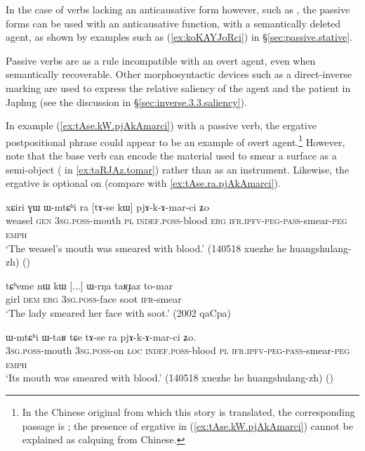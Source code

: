 In the case of verbs lacking an anticausative form however, such as  , the passive forms can be used with an anticausative function, with a semantically deleted agent, as shown by examples such as (\ref{ex:koKAYJoRci}) in §\ref{sec:passive.stative}.

Passive verbs are as a rule incompatible with an overt agent, even when semantically recoverable. Other morphosyntactic devices such as a direct-inverse marking are used to express the relative saliency of the agent and the patient in Japhug (see the discussion in §\ref{sec:inverse.3.3.saliency}).

In example (\ref{ex:tAse.kW.pjAkAmarci}) with a passive verb, the ergative postpositional phrase  could appear to be an example of overt agent.\footnote{In the Chinese original from which this story is translated, the corresponding passage is ; the presence of ergative in (\ref{ex:tAse.kW.pjAkAmarci}) cannot be explained as calquing from Chinese. } However, note that the base verb  can encode the material used to smear a surface as a semi-object ( in \ref{ex:taRJAz.tomar}) rather than as an instrument. Likewise, the ergative is optional on  (compare with \ref{ex:tAse.ra.pjAkAmarci}).

\begin{exe}
\ex \label{ex:tAse.kW.pjAkAmarci}
 \gll xɕiri ɣɯ ɯ-mtɕʰi ra [tɤ-se kɯ] pjɤ-k-ɤ-mar-ci ʑo \\
 weasel \textsc{gen} \textsc{3sg}.\textsc{poss}-mouth \textsc{pl} \textsc{indef}.\textsc{poss}-blood \textsc{erg} \textsc{ifr}.\textsc{ipfv}-\textsc{peg}-\textsc{pass}-smear-\textsc{peg} \textsc{emph} \\
\glt  `The weasel's mouth was smeared with blood.' (140518 xuezhe he huangshulang-zh)
()
\end{exe}

\begin{exe}
\ex \label{ex:taRJAz.tomar}
 \gll tɕʰeme nɯ kɯ  [...] ɯ-rŋa taʁɟaz to-mar \\
 girl \textsc{dem} \textsc{erg} { } \textsc{3sg}.\textsc{poss}-face soot \textsc{ifr}-smear \\
 \glt `The lady smeared her face with soot.' (2002 qaCpa)
\end{exe}

\begin{exe}
\ex \label{ex:tAse.ra.pjAkAmarci}
 \gll  ɯ-mtɕʰi ɯ-taʁ tɕe tɤ-se ra pjɤ-k-ɤ-mar-ci ʑo. \\
 \textsc{3sg}.\textsc{poss}-mouth \textsc{3sg}.\textsc{poss}-on \textsc{loc} \textsc{indef}.\textsc{poss}-blood \textsc{pl} \textsc{ifr}.\textsc{ipfv}-\textsc{peg}-\textsc{pass}-smear-\textsc{peg} \textsc{emph} \\
\glt  `Its mouth was smeared with blood.' (140518 xuezhe he huangshulang-zh) ()
\end{exe}

